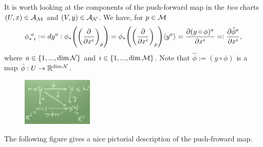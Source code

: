\documentclass[12pt]{article} %
\begin{document}
It is worth looking at the components of the push-forward map in the \textit{two} charts $(U,x)\in\mathcal{A}_{\mathcal{M}}$ and $(V,y)\in\mathcal{A}_{\mathcal{N}}$. We have, for $p\in\mathcal{M}$ 
\begin{align*} 
    \begin{split}
        \phi^{\,\,a}_{*\,\,i} := dy^a : \phi_*\Bigg(\bigg(\frac{\partial}{\partial x^i}\bigg)_p\Bigg) = \phi_*\Bigg(\bigg(\frac{\partial}{\partial x^i}\bigg)_p\Bigg)\langle y^a \rangle  = \frac{\partial (y\circ\phi)^a}{\partial x^i} =: \frac{\partial \hat{\phi}^a}{\partial x^i},
    \end{split}
\end{align*} 
where $a\in\{1,...,\dim\mathcal{N}\}$ and $i\in\{1,...,\dim\mathcal{M}\}$. Note that $\hat{\phi} := (y\circ\phi)$ is a map $\hat{\phi}:U\to\mathbb{R}^{\dim\mathcal{N}}$. 
 \begin{figure}[ht]
    \centering
    \includegraphics[width=0.3\textwidth]{Figs/4.png}
\end{figure}

The following figure gives a nice pictorial description of the push-froward map.
\end{document}

